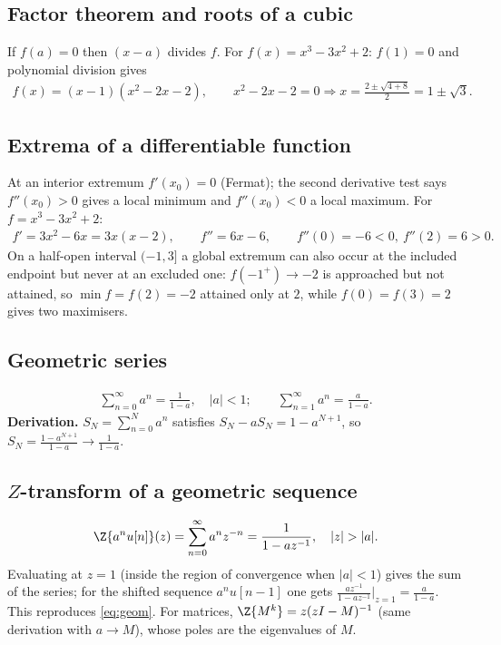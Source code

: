 \subsection{Factor theorem and roots of a cubic}
If $f(a)=0$ then $(x-a)$ divides $f$. For $f(x)=x^3-3x^2+2$: $f(1)=0$ and polynomial division gives
\begin{align}
f(x)=(x-1)(x^2-2x-2),\qquad x^2-2x-2=0\Rightarrow x=\frac{2\pm\sqrt{4+8}}{2}=1\pm\sqrt3. \label{eq:cubicroots}
\end{align}

\subsection{Extrema of a differentiable function}
At an interior extremum $f'(x_0)=0$ (Fermat); the second derivative test says $f''(x_0)>0$ gives a local
minimum and $f''(x_0)<0$ a local maximum. For $f=x^3-3x^2+2$:
\begin{align}
f'=3x^2-6x=3x(x-2),\qquad f''=6x-6,\qquad f''(0)=-6<0,\ f''(2)=6>0. \label{eq:extrema}
\end{align}
On a half-open interval $(-1,3]$ a global extremum can also occur at the included endpoint but never at an
excluded one: $f(-1^{+})\to-2$ is approached but not attained, so $\min f=f(2)=-2$ attained only at $2$,
while $f(0)=f(3)=2$ gives two maximisers.

\subsection{Geometric series}
\begin{align}
\sum_{n=0}^{\infty}a^n=\frac1{1-a},\quad |a|<1;\qquad
\sum_{n=1}^{\infty}a^n=\frac a{1-a}. \label{eq:geom}
\end{align}
\textbf{Derivation.} $S_N=\sum_{n=0}^{N}a^n$ satisfies $S_N-aS_N=1-a^{N+1}$, so $S_N=\frac{1-a^{N+1}}{1-a}\to\frac1{1-a}$.

\subsection{$Z$-transform of a geometric sequence}
\begin{align}
\Z\{a^nu[n]\}(z)=\sum_{n=0}^{\infty}a^nz^{-n}=\frac1{1-az^{-1}},\quad |z|>|a|. \label{eq:ztgeom}
\end{align}
Evaluating at $z=1$ (inside the region of convergence when $|a|<1$) gives the sum of the series; for the shifted
sequence $a^nu[n-1]$ one gets $\frac{az^{-1}}{1-az^{-1}}\big|_{z=1}=\frac{a}{1-a}$. This reproduces \eqref{eq:geom}.
For matrices, $\Z\{M^k\}=z(zI-M)^{-1}$ (same derivation with $a\to M$), whose poles are the eigenvalues of $M$.

